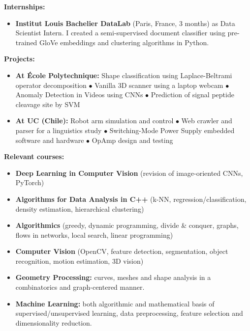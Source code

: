 
{\large \textbf{Internships:}}
\begin{itemize}
    \item \textbf{Institut Louis Bachelier DataLab} (Paris, France, 3 months) as Data Scientist Intern. I created a semi-supervised document classifier using pre-trained GloVe embeddings and clustering algorithms in Python.
\end{itemize}

{\large \textbf{Projects:}}



\begin{itemize}
    \item \textbf{At École Polytechnique:}
    Shape classification using Laplace-Beltrami operator decomposition $\bullet$ Vanilla 3D scanner using a laptop webcam $\bullet$ Anomaly Detection in Videos using CNNs $\bullet$ Prediction of signal peptide cleavage site by SVM
    
    \item \textbf{At UC (Chile):}
    Robot arm simulation and control $\bullet$ Web crawler and parser for a linguistics study $\bullet$ Switching-Mode Power Supply embedded software and hardware $\bullet$ OpAmp design and testing
\end{itemize}

{\large \textbf{Relevant courses:}}
\vspace{-1em}
\begin{multicols}{2}
\begin{itemize}
    \item \textbf{Deep Learning in Computer Vision} (revision of image-oriented CNNs, PyTorch)
    \item \textbf{Algorithms for Data Analysis in C++} (k-NN, regression/classification, density estimation, hierarchical clustering)
    \item \textbf{Algorithmics} (greedy, dynamic programming, divide \& conquer, graphs, flows in networks, local search, linear programming)
    \columnbreak
    \item \textbf{Computer Vision} (OpenCV, feature detection, segmentation, object recognition, motion estimation, 3D vision)
    \item \textbf{Geometry Processing:} curves, meshes and shape analysis in a combinatorics and graph-centered manner.
    \item \textbf{Machine Learning:} both algorithmic and mathematical basis of supervised/unsupervised learning, data preprocessing, feature selection and dimensionality reduction.
\end{itemize}
\end{multicols}
\vspace{-1.5em}